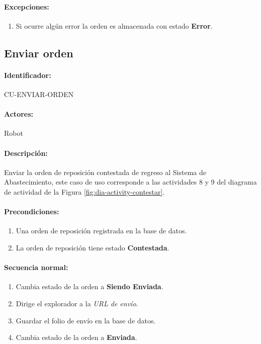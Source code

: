 \paragraph{Excepciones:}
\begin{enumerate}
  \item Si ocurre algún error la orden es almacenada con estado \textbf{Error}.
\end{enumerate}


\subsection{Enviar orden}\label{cu-enviar-orden}
\paragraph{Identificador:}
CU-ENVIAR-ORDEN
\paragraph{Actores:}
Robot
\paragraph{Descripción:}
Enviar la orden de reposición contestada de regreso al Sistema de Abastecimiento, este caso de uso corresponde a las actividades 8 y 9 del diagrama de actividad de la Figura \ref{fig:dia-activity-contestar}.
\paragraph{Precondiciones:}
\begin{enumerate}
  \item Una orden de reposición registrada en la base de datos.
  \item La orden de reposición tiene estado \textbf{Contestada}.
\end{enumerate}
\paragraph{Secuencia normal:}
\begin{enumerate}
  \item Cambia estado de la orden a \textbf{Siendo Enviada}.
  \item Dirige el explorador a la \textit{URL de envío}.
  \item Guardar el folio de envío en la base de datos.
  \item Cambia estado de la orden a \textbf{Enviada}.
\end{enumerate}
